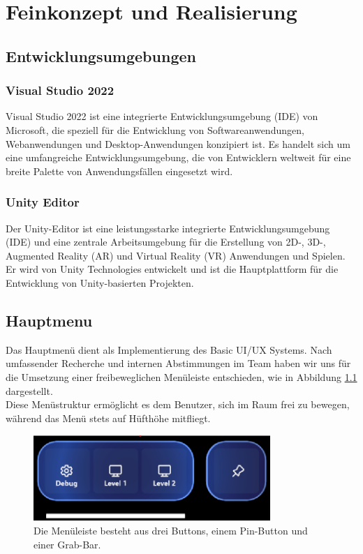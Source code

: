 \usepackage{graphicx}\chapter{Feinkonzept und Realisierung}

\section{Entwicklungsumgebungen}
\subsection{Visual Studio 2022}
Visual Studio 2022 ist eine integrierte Entwicklungsumgebung (IDE) von Microsoft, die speziell für die Entwicklung von
Softwareanwendungen, Webanwendungen und Desktop-Anwendungen konzipiert ist. Es handelt sich um eine umfangreiche
Entwicklungsumgebung, die von Entwicklern weltweit für eine breite Palette von Anwendungsfällen eingesetzt wird.

\subsection{Unity Editor}
Der Unity-Editor ist eine leistungsstarke integrierte Entwicklungsumgebung (IDE) und eine zentrale Arbeitsumgebung
für die Erstellung von 2D-, 3D-, Augmented Reality (AR) und Virtual Reality (VR) Anwendungen und Spielen. Er wird von
Unity Technologies entwickelt und ist die Hauptplattform für die Entwicklung von Unity-basierten Projekten.

\section{Hauptmenu}
Das Hauptmenü dient als Implementierung des Basic UI/UX Systems. Nach umfassender Recherche und internen
Abstimmungen im Team haben wir uns für die Umsetzung einer freibeweglichen Menüleiste entschieden, wie in
Abbildung \ref{fig:menübar} dargestellt.
\\
Diese Menüstruktur ermöglicht es dem Benutzer, sich im Raum frei zu bewegen, während das Menü stets
auf Hüfthöhe mitfliegt.

\begin{figure}[h]
    \centering
    \includegraphics[width=0.8\textwidth]{images/menubar.png}
    \caption{Die Menüleiste besteht aus drei Buttons, einem Pin-Button und einer Grab-Bar.}
    \label{fig:menübar}
\end{figure}

